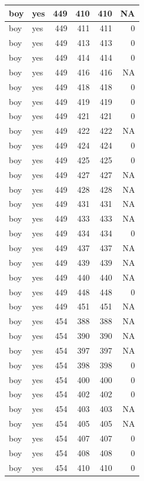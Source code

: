 \documentclass[man]{apa6}
\begin{document}
\begin{tabular}{l|l|r|r|r|r}
\hline
boy & yes & 449 & 410 & 410 & NA\\
\hline
boy & yes & 449 & 411 & 411 & 0\\
\hline
boy & yes & 449 & 413 & 413 & 0\\
\hline
boy & yes & 449 & 414 & 414 & 0\\
\hline
boy & yes & 449 & 416 & 416 & NA\\
\hline
boy & yes & 449 & 418 & 418 & 0\\
\hline
boy & yes & 449 & 419 & 419 & 0\\
\hline
boy & yes & 449 & 421 & 421 & 0\\
\hline
boy & yes & 449 & 422 & 422 & NA\\
\hline
boy & yes & 449 & 424 & 424 & 0\\
\hline
boy & yes & 449 & 425 & 425 & 0\\
\hline
boy & yes & 449 & 427 & 427 & NA\\
\hline
boy & yes & 449 & 428 & 428 & NA\\
\hline
boy & yes & 449 & 431 & 431 & NA\\
\hline
boy & yes & 449 & 433 & 433 & NA\\
\hline
boy & yes & 449 & 434 & 434 & 0\\
\hline
boy & yes & 449 & 437 & 437 & NA\\
\hline
boy & yes & 449 & 439 & 439 & NA\\
\hline
boy & yes & 449 & 440 & 440 & NA\\
\hline
boy & yes & 449 & 448 & 448 & 0\\
\hline
boy & yes & 449 & 451 & 451 & NA\\
\hline
boy & yes & 454 & 388 & 388 & NA\\
\hline
boy & yes & 454 & 390 & 390 & NA\\
\hline
boy & yes & 454 & 397 & 397 & NA\\
\hline
boy & yes & 454 & 398 & 398 & 0\\
\hline
boy & yes & 454 & 400 & 400 & 0\\
\hline
boy & yes & 454 & 402 & 402 & 0\\
\hline
boy & yes & 454 & 403 & 403 & NA\\
\hline
boy & yes & 454 & 405 & 405 & NA\\
\hline
boy & yes & 454 & 407 & 407 & 0\\
\hline
boy & yes & 454 & 408 & 408 & 0\\
\hline
boy & yes & 454 & 410 & 410 & 0\\

\end{tabular}
\end{document}
